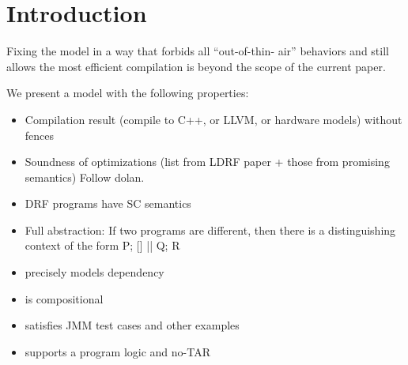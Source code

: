 \section{Introduction}
\label{sec:intro}

Fixing the model in a way that forbids all “out-of-thin- air” behaviors and still allows the most efficient compilation is beyond the scope of the current paper. 

We present a model with the following properties:
\begin{itemize}
\item Compilation result (compile to C++, or LLVM, or hardware models) without fences
\item Soundness of optimizations (list from LDRF paper + those from promising
  semantics)  Follow dolan.
\item DRF programs have SC semantics
  
\item Full abstraction:  If two programs are different, then there is a
  distinguishing context of the form P; [] || Q; R
\item precisely models dependency
\item is compositional
\item satisfies JMM test cases and other examples
\item supports a program logic and no-TAR
\end{itemize}

